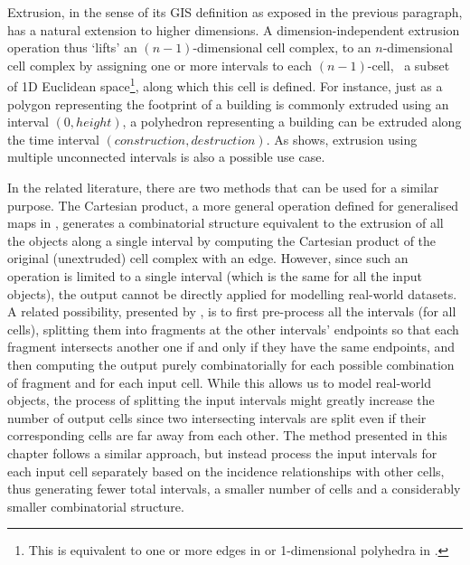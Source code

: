 Extrusion, in the sense of its GIS definition as exposed in the previous paragraph, has a natural extension to higher dimensions.
A dimension-independent extrusion operation thus `lifts' an $(n-1)$-dimensional cell complex, to an $n$-dimensional cell complex by assigning one or more intervals to each $(n-1)$-cell, \ie\ a subset of 1D Euclidean space\footnote{This is equivalent to one or more edges in \citet{Lienhardt04} or 1-dimensional polyhedra in \citet{Ferrucci93}.}, along which this cell is defined.
For instance, just as a polygon representing the footprint of a building is commonly extruded using an interval $(0, height)$, a polyhedron representing a building can be extruded along the time interval $(construction, destruction)$.
As  shows, extrusion using multiple unconnected intervals is also a possible use case.

In the related literature, there are two methods that can be used for a similar purpose.
The Cartesian product, a more general operation defined for generalised maps in \citet{Lienhardt04}, generates a combinatorial structure equivalent to the extrusion of all the objects along a single interval by computing the Cartesian product of the original (unextruded) cell complex with an edge.
However, since such an operation is limited to a single interval (which is the same for all the input objects), the output cannot be directly applied for modelling real-world datasets.
A related possibility, presented by \citet{Ferrucci93}, is to first pre-process all the intervals (for all cells), splitting them into fragments at the other intervals' endpoints so that each fragment intersects another one if and only if they have the same endpoints, and then computing the output purely combinatorially for each possible combination of fragment and for each input cell.
While this allows us to model real-world objects, the process of splitting the input intervals might greatly increase the number of output cells since two intersecting intervals are split even if their corresponding cells are far away from each other.
The method presented in this chapter follows a similar approach, but instead process the input intervals for each input cell separately based on the incidence relationships with other cells, thus generating fewer total intervals, a smaller number of cells and a considerably smaller combinatorial structure.

